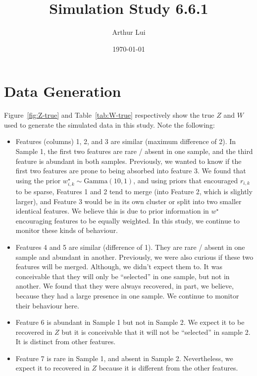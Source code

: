 \documentclass[10pt]{article} %
\title{Simulation Study 6.6.1}
\author{Arthur Lui}
\date{\today} %
\newcommand{\Gam}{ \text{Gamma} }
\begin{document}
\maketitle



\section{Data Generation}\label{sec:data-generation}
Figure~\ref{fig:Z-true} and Table~\ref{tab:W-true} respectively show the true
$Z$ and $W$ used to generate the simulated data in this study. Note the following:
\begin{itemize}
  \item Features (columns) 1, 2, and 3 are similar (maximum difference of 2).
    In Sample 1, the first two features are rare / absent in one sample, and
    the third feature is abundant in both samples. Previously, we wanted to
    know if the first two features are prone to being absorbed into feature 3. We
    found that using the prior $w^\star_{i,k} \sim \Gam(10, 1)$, and using priors
    that encouraged $r_{i,k}$ to be sparse, Features 1 and 2 tend to merge
    (into Feature 2, which is slightly larger), and Feature 3 would be in its
    own cluster or split into two smaller identical features. We believe this is 
    due to prior information in $w^\star$ encouraging features to be equally weighted.
    In this study, we continue to monitor these kinds of behaviour.
  \item Features 4 and 5 are similar (difference of 1). They are rare / absent
    in one sample and abundant in another. Previously, we were also curious if
    these two features will be merged. Although, we didn't expect them to. It was
    conceivable that they will only be ``selected'' in one sample, but not in
    another. We found that they were always recovered, in part, we believe, because
    they had a large presence in one sample. We continue to monitor their behaviour
    here.
  \item Feature 6 is abundant in Sample 1 but not in Sample 2. We expect it to be
    recovered in $Z$ but it is conceivable that it will not be ``selected'' in sample
    2. It is distinct from other features.
  \item Feature 7 is rare in Sample 1, and absent in Sample 2. Nevertheless, we
    expect it to recovered in $Z$ because it is different from the other
    features.
\end{itemize}
\end{document}
